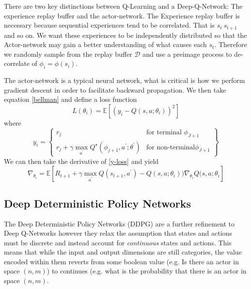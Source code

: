 \documentclass[doc, onecolumn, 12pt]{apa6}
\begin{document}
There are two key distinctions between Q-Learning and a Deep-Q-Network: The experience replay buffer and the actor-network. The Experience replay buffer is necessary because sequential experiences tend to be correlated. That is $s_{t} ~ s_{t+1}$ and so on.  We want these experiences to be independently distributed so that the Actor-network may gain a better understanding of what causes each $s_{t}$. Therefore we randomly sample from the replay buffer $\mathcal{D}$ and use a preimage process to de-correlate of $\phi_{i} = \phi(s_{i})$. 

The actor-network is a typical neural network, what is critical is how we perform gradient descent in order to facilitate backward propagation. We then take equation \eqref{bellman} and define a loss function \begin{equation}
\label{loss-dqn}
L(\theta_{i}) = \mathbb{E}  \left[ (y_{i} -Q(s,a;\theta_{i}))^{2} \right]
\end{equation} 
where \begin{equation} \label{y-loss}
y_{i} = 
		\left\{\begin{array}{lr}
		 r_{j}  & \text{for terminal }  \phi_{J+1} \\
		r_{j} + \gamma  \max_{a ^{\prime}} Q^{\star} (\phi_{j+1}, a^{\prime}; \theta^{\prime})  &  \text{for non-terminal}  \phi_{J+1} 
		\end{array} \right\}
\end{equation}
We can then take the derivative of \eqref{y-loss} and yield \begin{equation}
\label{loss-actor}
\nabla_{\theta_{i}} = \mathbb{E} \left[R_{t+1} + \gamma \max_{a^{\prime}} Q(s_{t+1},a^{\prime})-Q(s,  a; \theta_{i}))\nabla_{\theta_{i}}Q(s,a; \theta_{i} \right] 
\end{equation}

\FloatBarrier
\subsection{Deep Deterministic Policy Networks}
The Deep Deterministic Policy Networks (DDPG) are a further refinement to Deep Q-Networks however they relax the assumption that states and actions must be discrete and instead account for \emph{continuous} states and actions. This means that while the input and output dimensions are still categories, the value encoded within them reverts from some boolean value (e.g. Is there an actor in space $(n,m)$) to continues (e.g. what is the probability that there is an actor in space $(n,m)$. 
\end{document}
